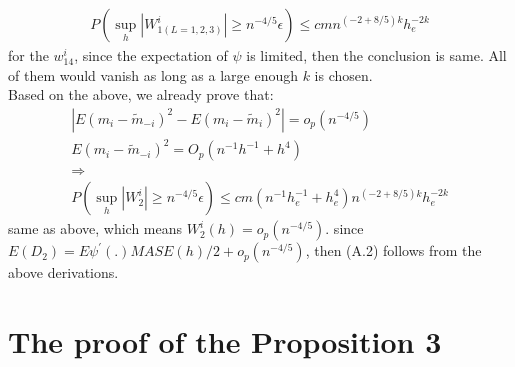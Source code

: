 \documentclass[12pt]{amsart}
\begin{document}
\begin{align}
P(\sup_{h}|W^{i}_{1(L=1,2,3)}|\geq n^{-4/5}\epsilon)\leq cmn^{(-2+8/5)k}h_{e}^{-2k}
\end{align}
for the $w^{i}_{14}$, since the expectation of $\psi$ is limited, then the conclusion is same. All of them would vanish as long as a large enough $k$ is chosen. 
\\
Based on the above, we already prove that:
\begin{align}
|E(m_{i}-\widetilde{m}_{-i})^2-E(m_{i}-\widetilde{m}_{i})^2|=o_{p}(n^{-4/5})\nonumber\\
E(m_{i}-\widetilde{m}_{-i})^{2}=O_{p}(n^{-1}h^{-1}+h^{4})\nonumber\\
\Rightarrow\nonumber\\
P(\sup_{h}|W^{i}_{2}|\geq n^{-4/5}\epsilon)\leq cm(n^{-1}h_{e}^{-1}+h_{e}^{4})n^{(-2+8/5)k}h_{e}^{-2k}
\end{align}
same as above, which means $W^{i}_{2}(h)=o_{p}(n^{-4/5})$.
since $E(D_{2})=E\psi^{'}(.)MASE(h)/2+o_{p}(n^{-4/5})$, then (A.2) follows from the above derivations.
\\
\section{The proof of the Proposition 3}
\end{document}
